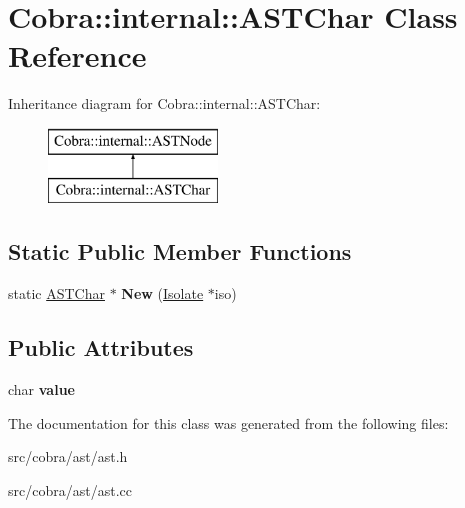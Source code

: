 \hypertarget{class_cobra_1_1internal_1_1_a_s_t_char}{\section{Cobra\+:\+:internal\+:\+:A\+S\+T\+Char Class Reference}
\label{class_cobra_1_1internal_1_1_a_s_t_char}
}
Inheritance diagram for Cobra\+:\+:internal\+:\+:A\+S\+T\+Char\+:\begin{figure}[H]
\begin{center}
\leavevmode
\includegraphics[height=2.000000cm]{class_cobra_1_1internal_1_1_a_s_t_char}
\end{center}
\end{figure}
\subsection*{Static Public Member Functions}
\begin{DoxyCompactItemize}
\item 
\hypertarget{class_cobra_1_1internal_1_1_a_s_t_char_a971799e30af09f339aca8a40d7dad7a7}{static \hyperlink{class_cobra_1_1internal_1_1_a_s_t_char}{A\+S\+T\+Char} $\ast$ {\bfseries New} (\hyperlink{class_cobra_1_1internal_1_1_isolate}{Isolate} $\ast$iso)}\label{class_cobra_1_1internal_1_1_a_s_t_char_a971799e30af09f339aca8a40d7dad7a7}

\end{DoxyCompactItemize}
\subsection*{Public Attributes}
\begin{DoxyCompactItemize}
\item 
\hypertarget{class_cobra_1_1internal_1_1_a_s_t_char_aa8b815df4fb708f5af29f9bb5311967d}{char {\bfseries value}}\label{class_cobra_1_1internal_1_1_a_s_t_char_aa8b815df4fb708f5af29f9bb5311967d}

\end{DoxyCompactItemize}


The documentation for this class was generated from the following files\+:\begin{DoxyCompactItemize}
\item 
src/cobra/ast/ast.\+h\item 
src/cobra/ast/ast.\+cc\end{DoxyCompactItemize}
